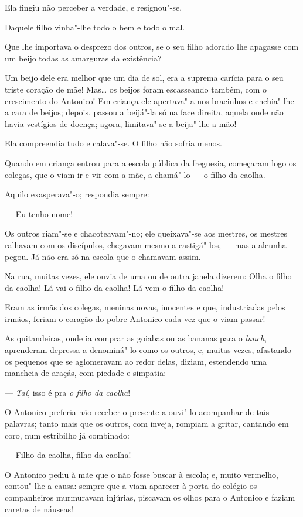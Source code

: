 Ela fingiu não perceber a verdade, e resignou"-se.

Daquele filho vinha"-lhe todo o bem e todo o mal.

Que lhe importava o desprezo dos outros, se o seu filho adorado lhe
apagasse com um beijo todas as amarguras da existência?

Um beijo dele era melhor que um dia de sol, era a suprema carícia para o
seu triste coração de mãe! Mas\ldots{} os beijos foram escasseando também,
com o crescimento do Antonico! Em criança ele apertava"-a nos bracinhos e
enchia"-lhe a cara de beijos; depois, passou a beijá"-la só na face
direita, aquela onde não havia vestígios de doença; agora, limitava"-se a
beija"-lhe a mão!

Ela compreendia tudo e calava"-se. O filho não sofria menos.

Quando em criança entrou para a escola pública da freguesia, começaram
logo os colegas, que o viam ir e vir com a mãe, a chamá"-lo --- o filho
da caolha.

Aquilo exasperava"-o; respondia sempre:

--- Eu tenho nome!

Os outros riam"-se e chacoteavam"-no; ele queixava"-se aos mestres, os
mestres ralhavam com os discípulos, chegavam mesmo a castigá"-los, ---
mas a alcunha pegou. Já não era só na escola que o chamavam assim.

Na rua, muitas vezes, ele ouvia de uma ou de outra janela dizerem: Olha
o filho da caolha! Lá vai o filho da caolha! Lá vem o filho da caolha!

Eram as irmãs dos colegas, meninas novas, inocentes e que, industriadas
pelos irmãos, feriam o coração do pobre Antonico cada vez que o viam
passar!

As quitandeiras, onde ia comprar as goiabas ou as bananas para o
\emph{lunch}, aprenderam depressa a denominá"-lo como os outros, e,
muitas vezes, afastando os pequenos que se aglomeravam ao redor delas,
diziam, estendendo uma mancheia de araçás, com piedade e simpatia:

--- \emph{Taí}, isso é pra \emph{o filho da caolha}!

O Antonico preferia não receber o presente a ouvi"-lo acompanhar de tais
palavras; tanto mais que os outros, com inveja, rompiam a gritar,
cantando em coro, num estribilho já combinado:

--- Filho da caolha, filho da caolha!

O Antonico pediu à mãe que o não fosse buscar à escola; e, muito
vermelho, contou"-lhe a causa: sempre que a viam aparecer à porta do
colégio os companheiros murmuravam injúrias, piscavam os olhos para o
Antonico e faziam caretas de náuseas!

